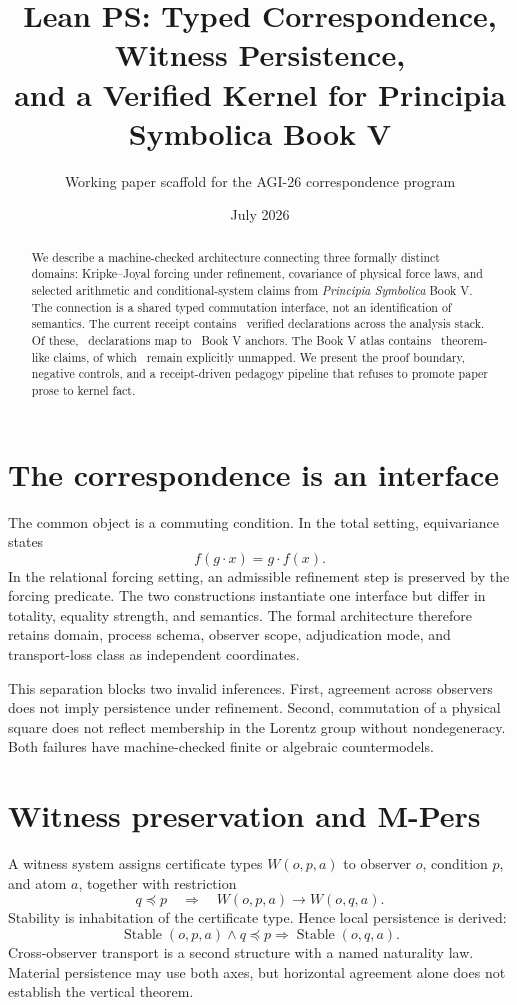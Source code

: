 \documentclass[11pt]{article}
\title{Lean PS: Typed Correspondence, Witness Persistence,\\
and a Verified Kernel for Principia Symbolica Book V}
\author{Working paper scaffold for the AGI-26 correspondence program}
\date{July 2026}
\begin{document}
\maketitle

\begin{abstract}
We describe a machine-checked architecture connecting three formally distinct
domains: Kripke--Joyal forcing under refinement, covariance of physical force
laws, and selected arithmetic and conditional-system claims from
\emph{Principia Symbolica} Book V.  The connection is a shared typed
commutation interface, not an identification of semantics.  The current receipt
contains \VerifiedDeclarationCount\ verified declarations across the analysis
stack.  Of these, \MappedBookFiveDeclarationCount\ declarations map to
\MappedBookFiveAnchorCount\ Book V anchors.  The Book V atlas contains
\BookFiveClaimNodeCount\ theorem-like claims, of which
\OpenBookFiveClaimCount\ remain explicitly unmapped.  We present the proof
boundary, negative controls, and a receipt-driven pedagogy pipeline that refuses
to promote paper prose to kernel fact.
\end{abstract}

\section{The correspondence is an interface}

The common object is a commuting condition.  In the total setting,
equivariance states
\[
  f(g\cdot x)=g\cdot f(x).
\]
In the relational forcing setting, an admissible refinement step is preserved
by the forcing predicate.  The two constructions instantiate one interface but
differ in totality, equality strength, and semantics.  The formal architecture
therefore retains domain, process schema, observer scope, adjudication mode,
and transport-loss class as independent coordinates.

This separation blocks two invalid inferences.  First, agreement across
observers does not imply persistence under refinement.  Second, commutation of
a physical square does not reflect membership in the Lorentz group without
nondegeneracy.  Both failures have machine-checked finite or algebraic
countermodels.

\section{Witness preservation and M-Pers}

A witness system assigns certificate types $W(o,p,a)$ to observer $o$,
condition $p$, and atom $a$, together with restriction
\[
  q\preceq p \quad\Longrightarrow\quad W(o,p,a)\to W(o,q,a).
\]
Stability is inhabitation of the certificate type.  Hence local persistence is
derived:
\[
  \operatorname{Stable}(o,p,a)\land q\preceq p
  \Longrightarrow \operatorname{Stable}(o,q,a).
\]
Cross-observer transport is a second structure with a named naturality law.
Material persistence may use both axes, but horizontal agreement alone does
not establish the vertical theorem.
\end{document}
